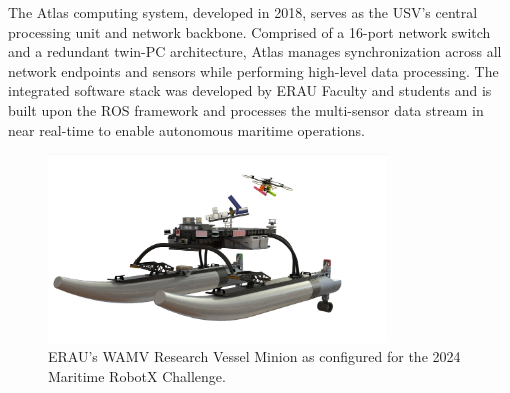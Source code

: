 \documentclass{erauthesis}
\begin{document}
The Atlas computing system, developed in 2018, serves as the \ac{USV}'s central processing unit and network backbone.
Comprised of a 16-port network switch and a redundant twin-PC architecture, Atlas manages synchronization across all network endpoints and sensors while performing high-level data processing.
The integrated software stack was developed by \ac{ERAU} Faculty and students and is built upon the \ac{ROS} framework and processes the multi-sensor data stream in near real-time to enable autonomous maritime operations.


\begin{figure}[t]
\centering
\includegraphics[width=0.8\textwidth]{Images/Minion.png}
\caption{ERAU's \ac{WAMV} Research Vessel Minion as configured for the 2024 Maritime RobotX Challenge.}
\label{fig:minion}
\end{figure}
\end{document}
